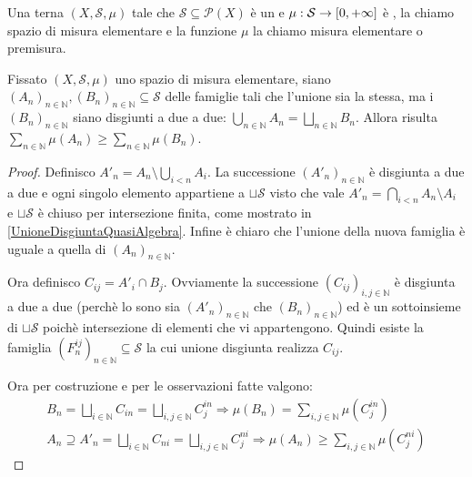 \begin{definition}
	Una terna $(X,\mathcal S,\mu)$ tale che $\mathcal S\subseteq\mathcal P(X)$ è un \semiring{} e $\mu:\mathcal S\to [0,+\infty]$ è \sigadd{}, la chiamo spazio di misura elementare e la funzione $\mu$ la chiamo misura elementare o premisura.
\end{definition}

\begin{lemma}\label{CoerenzaPremisura}
	Fissato $(X,\mathcal S,\mu)$ uno spazio di misura elementare, siano $(A_n)_{n\in\mathbb N},(B_n)_{n\in\mathbb N}\subseteq\mathcal S$ delle famiglie tali che l'unione sia la stessa, ma i $(B_n)_{n\in\mathbb N}$ siano disgiunti a due a due: $\bigcup_{n\in\mathbb N}A_n=\bigsqcup_{n\in\mathbb N}B_n$.
	Allora risulta $\sum_{n\in\mathbb N}\mu(A_n)\ge \sum_{n\in\mathbb N}\mu(B_n)$.
\end{lemma}
\begin{proof}
	Definisco $A'_n=A_n\setminus\bigcup_{i<n}A_i$. La successione $(A'_n)_{n\in\mathbb N}$ è disgiunta a due a due e ogni singolo elemento appartiene a $\sqcup \mathcal S$ visto che vale $A'_n=\bigcap_{i<n}A_n\setminus A_i$ e $\sqcup \mathcal S$ è chiuso per intersezione finita, come mostrato in \cref{UnioneDisgiuntaQuasiAlgebra}. Infine è chiaro che l'unione della nuova famiglia è uguale a quella di $(A_n)_{n\in\mathbb N}$.
	
	Ora definisco $C_{ij}=A'_i\cap B_j$. Ovviamente la successione $(C_{ij})_{i,j\in\mathbb N}$ è disgiunta a due a due (perchè lo sono sia $(A'_n)_{n\in\mathbb N}$ che $(B_n)_{n\in\mathbb N}$) ed è un sottoinsieme di $\sqcup\mathcal S$ poichè intersezione di elementi che vi appartengono. Quindi esiste la famiglia $(F^{ij}_n)_{n\in\mathbb N}\subseteq\mathcal S$ la cui unione disgiunta realizza $C_{ij}$.
	
	Ora per costruzione e per le osservazioni fatte valgono:
	\begin{align*}
		B_n=\bigsqcup_{i\in\mathbb N}C_{in}=\bigsqcup_{i,j\in\mathbb N}C^{in}_j
		\Longrightarrow \mu(B_n)=\sum_{i,j\in\mathbb N}\mu(C^{in}_j)\\
		A_n\supseteq A'_n=\bigsqcup_{i\in\mathbb N}C_{ni}=\bigsqcup_{i,j\in\mathbb N}C^{ni}_j
		\Longrightarrow \mu(A_n)\ge\sum_{i,j\in\mathbb N}\mu(C^{ni}_j)
	\end{align*}


\end{proof}




